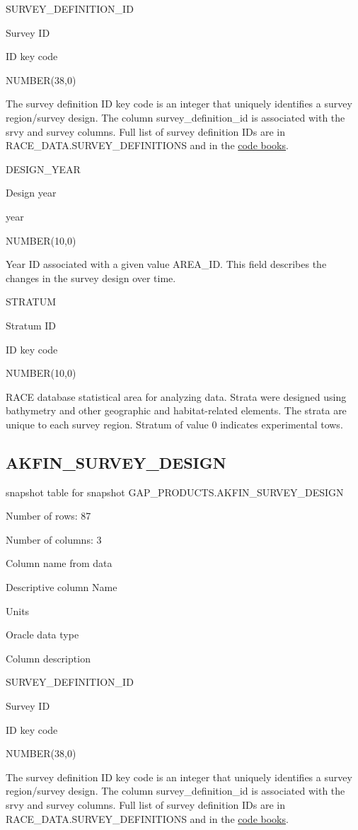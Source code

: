 \documentclass[
  letterpaper,
  oneside,
  open=any]{scrbook}
\begin{document}
SURVEY\_DEFINITION\_ID

Survey ID

ID key code

NUMBER(38,0)

The survey definition ID key code is an integer that uniquely identifies
a survey region/survey design. The column survey\_definition\_id is
associated with the srvy and survey columns. Full list of survey
definition IDs are in RACE\_DATA.SURVEY\_DEFINITIONS and in the
\href{https://www.fisheries.noaa.gov/resource/document/groundfish-survey-species-code-manual-and-data-codes-manual}{code
books}.

DESIGN\_YEAR

Design year

year

NUMBER(10,0)

Year ID associated with a given value AREA\_ID. This field describes the
changes in the survey design over time.

STRATUM

Stratum ID

ID key code

NUMBER(10,0)

RACE database statistical area for analyzing data. Strata were designed
using bathymetry and other geographic and habitat-related elements. The
strata are unique to each survey region. Stratum of value 0 indicates
experimental tows.

\subsection{AKFIN\_SURVEY\_DESIGN}\label{akfin_survey_design}

snapshot table for snapshot GAP\_PRODUCTS.AKFIN\_SURVEY\_DESIGN

Number of rows: 87

Number of columns: 3

Column name from data

Descriptive column Name

Units

Oracle data type

Column description

SURVEY\_DEFINITION\_ID

Survey ID

ID key code

NUMBER(38,0)

The survey definition ID key code is an integer that uniquely identifies
a survey region/survey design. The column survey\_definition\_id is
associated with the srvy and survey columns. Full list of survey
definition IDs are in RACE\_DATA.SURVEY\_DEFINITIONS and in the
\href{https://www.fisheries.noaa.gov/resource/document/groundfish-survey-species-code-manual-and-data-codes-manual}{code
books}.
\end{document}
